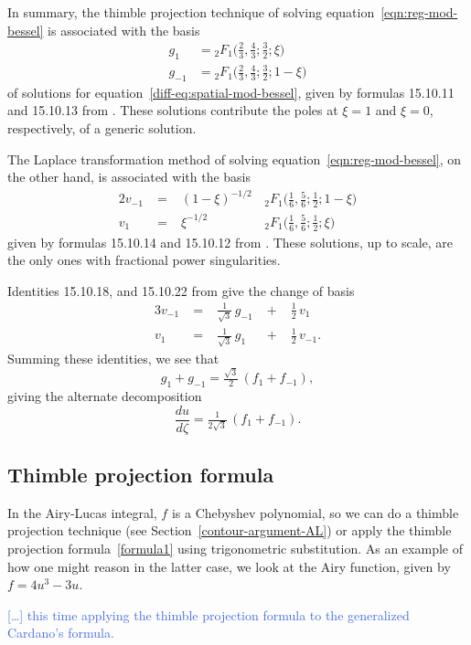 \documentclass{article}
\theoremstyle{definition}
\theoremstyle{plain}
\begin{document}
In summary, the thimble projection technique of solving equation~\eqref{eqn:reg-mod-bessel} is associated with the basis
\begin{align*}
g_{1} & = {}_2F_1\big(\tfrac{2}{3}, \tfrac{4}{3}; \tfrac{3}{2}; \xi\big) \\
g_{-1} & = {}_2F_1\big(\tfrac{2}{3}, \tfrac{4}{3}; \tfrac{3}{2}; 1-\xi\big)
\end{align*}
of solutions for equation~\eqref{diff-eq:spatial-mod-bessel}, given by formulas 15.10.11 and 15.10.13 from \cite{dlmf}. These solutions contribute the poles at $\xi = 1$ and $\xi = 0$, respectively, of a generic solution.

The Laplace transformation method of solving equation~\eqref{eqn:reg-mod-bessel}, on the other hand, is associated with the basis
\begin{alignat*}{2}
v_{-1} &\;=\;& (1-\xi)^{-1/2} & \, {}_2F_1\big(\tfrac{1}{6}, \tfrac{5}{6}; \tfrac{1}{2}; 1-\xi\big) \\
v_1 &\;=\:& \xi^{-1/2} & \, {}_2F_1\big(\tfrac{1}{6}, \tfrac{5}{6}; \tfrac{1}{2}; \xi\big)
\end{alignat*}
given by formulas 15.10.14 and 15.10.12 from \cite{dlmf}. These solutions, up to scale, are the only ones with fractional power singularities.

Identities 15.10.18, and 15.10.22 from \cite{dlmf} give the change of basis
\begin{alignat*}{3}
v_{-1} &\;=\;&\tfrac{1}{\sqrt{3}}\,g_{-1} &\;+\;& \tfrac{1}{2}\,v_1 \\
v_1 &\;=\;& \tfrac{1}{\sqrt{3}}\,g_{1} &\;+\;& \tfrac{1}{2}\,v_{-1}.
\end{alignat*}
Summing these identities, we see that
\[ g_1 + g_{-1} = \tfrac{\sqrt{3}}{2}\,(f_1 + f_{-1}), \]
giving the alternate decomposition
\[ \frac{du}{d\zeta} = \tfrac{1}{2\sqrt{3}}\,(f_1 + f_{-1}). \]

\subsection{Thimble projection formula}

In the Airy-Lucas integral, $f$ is a Chebyshev polynomial, so we can do a thimble projection technique (see Section~\ref{contour-argument-AL}) or apply the thimble projection formula~\eqref{formula1} using trigonometric substitution. As an example of how one might reason in the latter case, we look at the Airy function, given by $f = 4u^3-3u$.

\textcolor{RoyalBlue}{[\ldots] this time applying the thimble projection formula to the generalized Cardano's formula.}
\end{document}
